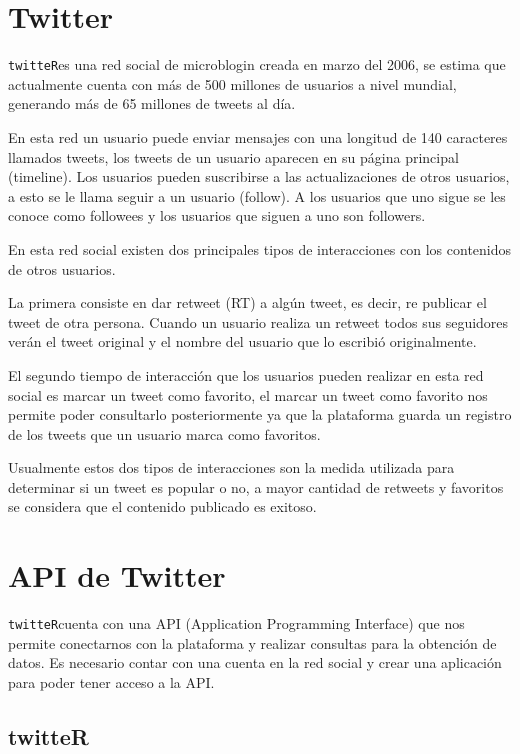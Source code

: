 \documentclass[openright, 12pt, twoside]{report}\usepackage[]{graphicx}\usepackage[]{color}
\begin{document}
\section{Twitter}

\texttt{twitteR}es una red social de microblogin creada en marzo del 2006, se estima que actualmente cuenta con más de 500 millones de usuarios a nivel mundial, generando más de 65 millones de tweets al día.

En esta red un usuario puede enviar mensajes con una longitud de 140 caracteres llamados tweets, los tweets de un usuario aparecen en su página principal (timeline). Los usuarios pueden suscribirse a las actualizaciones de otros usuarios, a esto se le llama seguir a un usuario (follow). A los usuarios que uno sigue se les conoce como followees y los usuarios que siguen a uno son followers.

En esta red social existen dos principales tipos de interacciones con los contenidos de otros usuarios. 

La primera consiste en dar retweet (RT) a algún tweet, es decir, re publicar el tweet de otra persona. Cuando un usuario realiza un retweet todos sus seguidores verán el tweet original y el nombre del usuario que lo escribió originalmente. 

El segundo tiempo de interacción que los usuarios pueden realizar en esta red social es marcar un tweet como favorito, el marcar un tweet como favorito nos permite poder consultarlo posteriormente ya que la plataforma guarda un registro de los tweets que un usuario marca como favoritos.

Usualmente estos dos tipos de interacciones son la medida utilizada para determinar si un tweet es popular o no, a mayor cantidad de retweets y favoritos se considera que el contenido publicado es exitoso.

\section{API de Twitter}


\texttt{twitteR}cuenta con una API (Application Programming Interface) que nos permite conectarnos con la plataforma y realizar consultas para la obtención de datos. Es necesario contar con una cuenta en la red social y crear una aplicación para poder tener acceso a la API.

\subsection*{twitteR}
\end{document}
